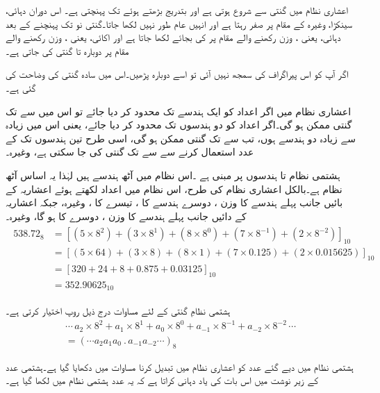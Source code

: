 	اعشاری نظام میں گنتی  سے شروع ہوتی ہے اور بتدریج بڑھتے ہوئے  تک پہنچتی ہے۔ اس دوران دہائی، سینکڑا، وغیرہ کے مقام پر صفر رہتا ہے اور انہیں عام طور نہیں لکھا جاتا۔گنتی نو تک پہنچنے کے بعد دہائی، یعنی ، وزن رکھنے والے مقام پر  کی بجائے  لکھا جاتا ہے اور اکائی، یعنی ، وزن رکھنے والے مقام پر دوبارہ  تا  گنتی کی جاتی ہے۔ 
	
	اگر آپ کو اس پیراگراف کی سمجھ نہیں آئی تو اسے دوبارہ پڑھیں۔اس میں سادہ گنتی کی وضاحت کی گئی ہے۔ 
	
	اعشاری نظام میں اگر اعداد کو ایک ہندسے تک محدود کر دیا جائے تو اس میں  سے  تک گنتی ممکن ہو گی۔اگر اعداد کو دو ہندسوں تک محدود کر دیا جائے، یعنی اس میں زیادہ سے زیادہ دو ہندسے ہوں، تب  سے  تک گنتی ممکن ہو گی، اسی طرح تین ہندسوں تک کے عدد استعمال کرنے سے  سے  تک گنتی کی جا سکتی ہے، وغیرہ۔
	 


	ہشتمی نظام  تا  ہندسوں پر مبنی ہے ۔اس نظام میں آٹھ ہندسے ہیں لہٰذا یہ اساس آٹھ نظام ہے۔بالکل اعشاری نظام کی طرح، اس نظام میں اعداد لکھتے ہوئے اعشاریہ کے بائیں جانب پہلے ہندسے کا وزن  ، دوسرے ہندسے کا  ، تیسرے کا ، وغیرہ، جبکہ اعشاریہ کے دائیں جانب پہلے ہندسے کا وزن ، دوسرے کا  ہو گا، وغیرہ۔
\begin{gather}
\begin{aligned}\label{مساوات_ثنائی_آٹھ}
538.72_8&=[(5\times 8^2)+(3\times 8^1)+(8\times8^0)+(7\times 8^{-1})+(2\times 8^{-2})]_{10}\\
&=[(5\times 64)+(3\times 8)+(8\times 1)+(7\times 0.125)+(2\times 0.015625)]_{10}\\
&=[320+24+8+0.875+0.03125]_{10}\\
&=352.90625_{10}
\end{aligned}
\end{gather}

	 ہشتمی نظامِ گنتی کے لئے مساوات  درج ذیل روپ اختیار کرتی ہے۔
\begin{multline}
\cdots\, a_2\times 8^2+a_1\times 8^1+a_0\times 8^0+a_{-1}\times 8^{-1}+a_{-2}\times 8^{-2}\,\cdots\\
=(\cdots a_2a_1a_0\ . \,a_{-1}a_{-2}\cdots)_{8}
\end{multline}

	 ہشتمی نظام میں دیے گئے عدد کو اعشاری نظام میں تبدیل کرنا مساوات  میں دکھایا گیا ہے۔ہشتمی عدد کے زیر نوشت میں  اس بات کی یاد دہانی کراتا ہے کہ یہ عدد ہشتمی نظام میں لکھا گیا ہے۔ 
	 
